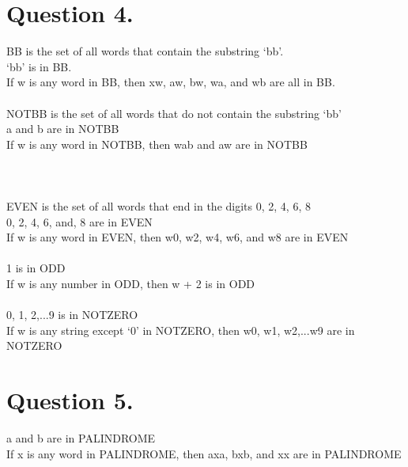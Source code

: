 \documentclass[titlepage]{article}
\begin{document}
\section*{Question 4.}
{
    BB is the set of all words that contain the substring ‘bb’.\\
    ‘bb’ is in BB.\\
    If w is any word in BB, then xw, aw, bw, wa, and wb are all in BB.\\\\
    NOTBB is the set of all words that do not contain the substring ‘bb’\\
    a and b are in NOTBB\\
    If w is any word in NOTBB, then wab and aw are in NOTBB\\\\\\\\
    EVEN is the set of all words that end in the digits {0, 2, 4, 6, 8}\\
    0, 2, 4, 6, and, 8 are in EVEN\\
    If w is any word in EVEN, then w0, w2, w4, w6, and w8 are in EVEN\\\\
    1 is in ODD\\
    If w is any number in ODD, then w + 2 is in ODD\\\\
    {0, 1, 2,...9} is in NOTZERO\\
    If w is any string except ‘0’ in NOTZERO, then w0, w1, w2,...w9 are in NOTZERO

}
\section*{Question 5.}
{
    a and b are in PALINDROME\\
    If x is any word in PALINDROME, then axa, bxb, and xx are in PALINDROME
}
\end{document}
